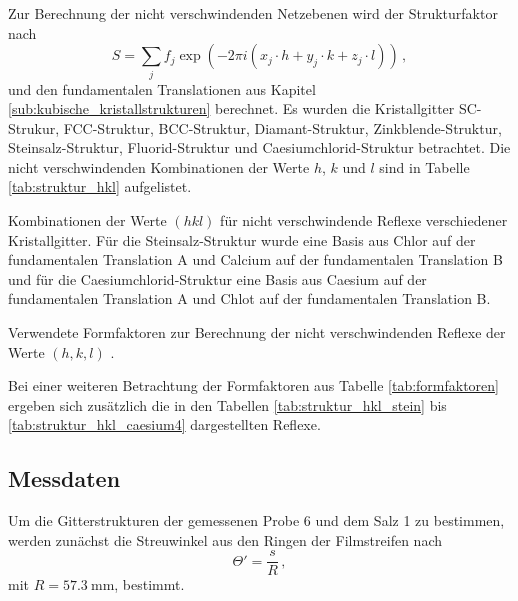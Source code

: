 Zur Berechnung der nicht verschwindenden Netzebenen wird der Strukturfaktor nach
\begin{equation*}
    S = \sum_j{f_j \exp{(-2 \pi i(x_j \cdot h + y_j \cdot k + z_j \cdot l))}}\,,
\end{equation*}
und den fundamentalen Translationen aus Kapitel \ref{sub:kubische_kristallstrukturen} berechnet.
Es wurden die Kristallgitter SC-Strukur, FCC-Struktur, BCC-Struktur, Diamant-Struktur, Zinkblende-Struktur, Steinsalz-Struktur, Fluorid-Struktur und Caesiumchlorid-Struktur betrachtet.
Die nicht verschwindenden Kombinationen der Werte $h$, $k$ und $l$ sind in Tabelle \ref{tab:struktur_hkl} aufgelistet.
\begin{table}[!ht]
    \centering
    \caption{Kombinationen der Werte $(h k l)$ für nicht verschwindende Reflexe verschiedener Kristallgitter. Für die Steinsalz-Struktur wurde eine Basis aus Chlor auf der fundamentalen Translation A und Calcium auf der fundamentalen Translation B und für die Caesiumchlorid-Struktur eine Basis aus Caesium auf der fundamentalen Translation A und Chlot auf der fundamentalen Translation B.}
    
    \label{tab:struktur_hkl}
\end{table}
\begin{table}[!ht]
    \centering
    \caption{Verwendete Formfaktoren zur Berechnung der nicht verschwindenden Reflexe der Werte $(h, k, l)$ \cite{V41}.}
    
    \label{tab:formfaktoren}
\end{table}
Bei einer weiteren Betrachtung der Formfaktoren aus Tabelle \ref{tab:formfaktoren} ergeben sich zusätzlich die in den Tabellen \ref{tab:struktur_hkl_stein} bis \ref{tab:struktur_hkl_caesium4} dargestellten Reflexe.


\subsection{Messdaten} %
\label{sub:messdaten}

Um die Gitterstrukturen der gemessenen Probe 6 und dem Salz 1 zu bestimmen, werden zunächst die Streuwinkel aus den Ringen der Filmstreifen nach
\begin{equation*}
    \Theta' = \frac{s}{R}\,,
\end{equation*}
mit $R = \SI{57.3}{\milli\meter}$, bestimmt.

